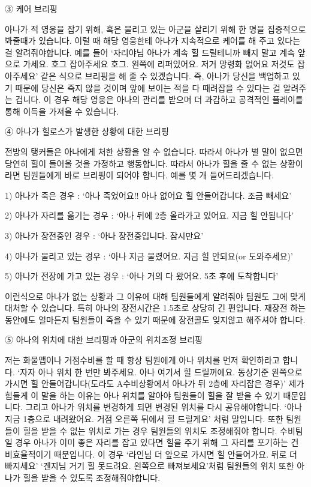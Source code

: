  

③ 케어 브리핑

아나가 적 영웅을 잡기 위해, 혹은 물리고 있는 아군을 살리기 위해 한 명을 집중적으로 봐줄때가 있습니다. 이럴 때 해당 영웅한테 아나가 지속적으로 케어를 해 주고 있다는 걸 알려줘야합니다. 예를 들어 ‘자리야님 아나가 계속 힐 드릴테니까 빼지 말고 계속 앞으로 가세요. 호그 잡아주세요 호그. 왼쪽에 리퍼있어요. 저거 망령화 없어요 저것도 잡아주세요’ 같은 식으로 브리핑을 해 줄 수 있겠습니다. 즉, 아나가 당신을 백업하고 있기 때문에 당신은 죽지 않을 것이며 앞에 보이는 적을 다 때려잡을 수 있다는 걸 알려주는 겁니다. 이 경우 해당 영웅은 아나의 관리를 받으며 더 과감하고 공격적인 플레이를 통해 이득을 가져올 수 있습니다.

 

④ 아나가 힐로스가 발생한 상황에 대한 브리핑

전방의 탱커들은 아나에게 처한 상황을 알 수 없습니다. 따라서 아나가 별 말이 없으면 당연히 힐이 들어올 것을 가정하고 행동합니다. 따라서 아나가 힐을 줄 수 없는 상황이라면 팀원들에게 바로 브리핑이 되어야 합니다. 예를 몇 개 들어드리겠습니다.

 

1) 아나가 죽은 경우 : ‘아나 죽었어요!! 아나 없어요 힐 안들어갑니다. 조금 빼세요’

2) 아나가 자리를 옮기는 경우 : ‘아나 뒤에 2층 올라가고 있어요. 지금 힐 안됩니다’

3) 아나가 장전중인 경우 : ‘아나 장전중입니다. 잠시만요’

4) 아나가 물리고 있는 경우 : ‘아나 지금 물렸어요. 지금 힐 안되요(or 도와주세요)’

5) 아나가 전장에 가고 있는 경우 : ‘아나 거의 다 왔어요. 5초 후에 도착합니다’

 

이런식으로 아나가 없는 상황과 그 이유에 대해 팀원들에게 알려줘야 팀원도 그에 맞게 대처할 수 있습니다. 특히 아나의 장전시간은 1.5초로 상당히 긴 편입니다. 재장전 하는 동안에도 얼마든지 팀원들이 죽을 수 있기 때문에 장전콜도 잊지않고 해주셔야 합니다.

 

⑤ 아나의 위치에 대한 브리핑과 아군의 위치조정 브리핑

저는 화물맵이나 거점수비를 할 때 항상 팀원에게 아나 위치를 먼저 확인하라고 합니다. ‘자자 아나 위치 한 번만 봐주세요. 아나 여기서 힐 드릴꺼에요. 동상기준 왼쪽으로 가시면 힐 안들어갑니다(도라도 A수비상황에서 아나가 뒤 2층에 자리잡은 경우)’ 제가 힘들게 이 말을 하는 이유는 아나 위치를 알아야 팀원들이 힐을 잘 받을 수 있기 때문입니다. 그리고 아나가 위치를 변경하게 되면 변경된 위치를 다시 공유해야합니다. ‘아나 지금 1층으로 내려왔어요. 거점 오른쪽 뒤에서 힐 드릴게요’ 처럼 말입니다. 또한 팀원들이 힐을 받을 수 없는 위치로 가는 경우 팀원들의 위치도 조정해줘야 합니다. 수비팀일 경우 아나가 이미 좋은 자리를 잡고 있다면 힐을 주기 위해 그 자리를 포기하는 건 비효율적이기 때문입니다. 이 경우 ‘라인님 더 앞으로 가시면 힐 안들어가요. 뒤로 더 빠지세요’ ‘겐지님 거기 힐 못드려요. 왼쪽으로 빠져보세요’처럼 팀원들의 위치 또한 아나가 힐을 받을 수 있도록 조정해줘야합니다.

